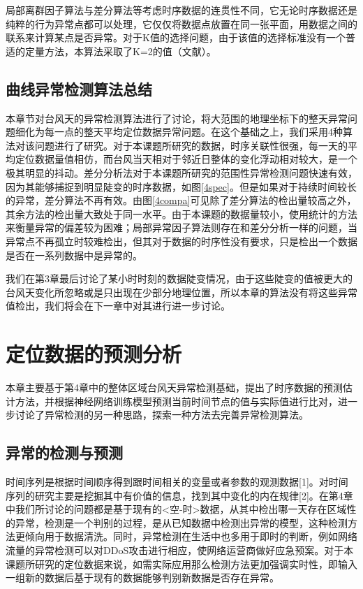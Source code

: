 \documentclass[a4paper,AutoFakeBold,oneside,12pt]{book}
\begin{document}
{{

局部离群因子算法与差分算法等考虑时序数据的连贯性不同，它无论时序数据还是纯粹的行为异常点都可以处理，它仅仅将数据点放置在同一张平面，用数据之间的联系来计算某点是否异常。对于K值的选择问题，由于该值的选择标准没有一个普适的定量方法，本算法采取了K=2的值（文献）。


\section{曲线异常检测算法总结}


	本章节对台风天的异常检测算法进行了讨论，将大范围的地理坐标下的整天异常问题细化为每一点的整天平均定位数据异常问题。在这个基础之上，我们采用4种算法对该问题进行了研究。对于本课题所研究的数据，时序关联性很强，每一天的平均定位数据量值相仿，而台风当天相对于邻近日整体的变化浮动相对较大，是一个极其明显的抖动。差分分析法对于本课题所研究的范围性异常检测问题快速有效，因为其能够捕捉到明显陡变的时序数据，如图\ref{4spec}。但是如果对于持续时间较长的异常，差分算法不再有效。由图\ref{4compa}可见除了差分算法的检出量较高之外，其余方法的检出量大致处于同一水平。由于本课题的数据量较小，使用统计的方法来衡量异常的偏差较为困难；局部异常因子算法则存在和差分分析一样的问题，当异常点不再孤立时较难检出，但其对于数据的时序性没有要求，只是检出一个数据是否在一系列数据中是异常的。


	我们在第3章最后讨论了某小时时刻的数据陡变情况，由于这些陡变的值被更大的台风天变化所忽略或是只出现在少部分地理位置，所以本章的算法没有将这些异常值检出，我们将会在下一章中对其进行进一步讨论。

\chapter{定位数据的预测分析}
	本章主要基于第4章中的整体区域台风天异常检测基础，提出了时序数据的预测估计方法，并根据神经网络训练模型预测当前时间节点的值与实际值进行比对，进一步讨论了异常检测的另一种思路，探索一种方法去完善异常检测算法。

\section{异常的检测与预测}
	时间序列是根据时间顺序得到跟时间相关的变量或者参数的观测数据[1]。对时间序列的研究主要是挖掘其中有价值的信息，找到其中变化的内在规律[2]。在第4章中我们所讨论的问题都是基于现有的<空-时>数据，从其中检出哪一天存在区域性的异常，检测是一个判别的过程，是从已知数据中检测出异常的模型，这种检测方法更倾向用于数据清洗。同时，异常检测在生活中也多用于即时的判断，例如网络流量的异常检测可以对DDoS攻击进行相应，使网络运营商做好应急预案。对于本课题所研究的定位数据来说，如需实际应用那么检测方法更加强调实时性，即输入一组新的数据后基于现有的数据能够判别新数据是否存在异常。

}}
\end{document}
